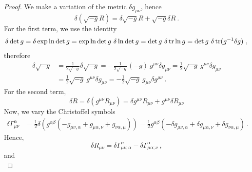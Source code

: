     \begin{proof}
        We make a variation of the metric $\delta g_{\mu\nu}$, hence 
        \begin{equation*}
            \delta (\sqrt{-g} R) = \delta \sqrt{-g} R + \sqrt{-g} \delta R ~.
        \end{equation*}
        For the first term, we use the identity 
        \begin{equation*}
        \begin{aligned}
            \delta \det g = \delta \exp \ln \det g = \exp \ln \det g ~ \delta \ln \det g = \det g ~ \delta \operatorname{tr} \ln g = \det g ~ \delta \operatorname{tr} (g^{-1} \delta g)  ~,
        \end{aligned}
        \end{equation*}
        therefore 
        \begin{equation}\label{proof1}
        \begin{aligned}
            \delta \sqrt{-g} & = \frac{1}{2 \sqrt{-g}} \delta \sqrt{-g} = - \frac{1}{2 \sqrt{-g}} (- g) ~ g^{\mu\nu} \delta g_{\mu\nu} = \frac{1}{2} \sqrt{-g} ~ g^{\mu\nu} \delta g_{\mu\nu} \\ & = \frac{1}{2} \sqrt{-g} ~ g^{\mu\nu} \delta g_{\mu\nu} = - \frac{1}{2} \sqrt{-g} ~ g_{\mu\nu} \delta g^{\mu\nu} ~.
        \end{aligned}
        \end{equation}
        For the second term, 
        \begin{equation*}
            \delta R = \delta (g^{\mu\nu} R_{\mu\nu}) = \delta g^{\mu\nu} R_{\mu\nu} + g^{\mu\nu} \delta R_{\mu\nu}
        \end{equation*}
        Now, we vary the Christoffel symbols 
        \begin{equation}\label{varch}
        \begin{aligned}
            \delta \Gamma^\alpha_{\mu\nu} & = \frac{1}{2} \delta (g^{\alpha \beta} (- g_{\mu\nu, \alpha} + g_{\mu\alpha,\nu} + g_{\nu \alpha, \mu} )  ) = \frac{1}{2} g^{\alpha \beta} (- \delta g_{\mu\nu, \alpha} + \delta g_{\mu\alpha,\nu} + \delta  g_{\nu \alpha, \mu} ) ~.
        \end{aligned}
        \end{equation}
        Hence, 
        \begin{equation*}
            \delta R_{\mu\nu} = \delta \Gamma^{\alpha}_{\mu\nu;\alpha} - \delta \Gamma^{\alpha}_{\mu\alpha;\nu} ~,
        \end{equation*}
        and 
        \begin{equation*}

\end{equation*}
\end{proof}
